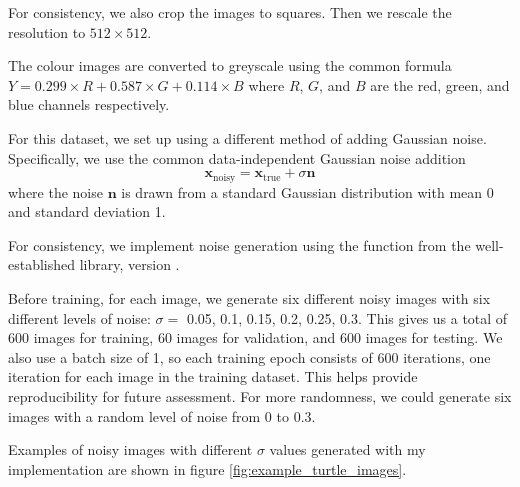 \documentclass[12pt]{article}
\begin{document}
For consistency, we also crop the images to squares. Then we rescale the resolution to $512 \times 512$.

The colour images are converted to greyscale using the common formula $Y = 0.299 \times R + 0.587 \times G + 0.114 \times B$ where $R$, $G$, and $B$ are the red, green, and blue channels respectively.

For this dataset, we set up using a different method of adding Gaussian noise. Specifically, we use the common data-independent Gaussian noise addition
\begin{equation}
    \mathbf{x}_{\text{noisy}} = \mathbf{x}_{\text{true}} + \sigma \mathbf{n}
\end{equation}
where the noise $\mathbf{n}$ is drawn from a standard Gaussian distribution with mean 0 and standard deviation 1.

For consistency, we implement noise generation using the
 function from the well-established  library, version .

Before training, for each image, we generate six different noisy images with six different levels of noise: $\sigma =$ 0.05, 0.1, 0.15, 0.2, 0.25, 0.3.
This gives us a total of 600 images for training, 60 images for validation, and 600 images for testing.
We also use a batch size of 1, so each training epoch consists of 600 iterations, one iteration for each image in the training dataset.
This helps provide reproducibility for future assessment.
For more randomness, we could generate six images with a random level of noise from 0 to 0.3.


Examples of noisy images with different $\sigma$ values generated with my implementation 
are shown in figure \ref{fig:example_turtle_images}.
\end{document}
